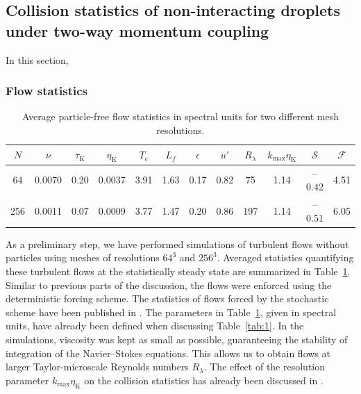 \documentclass[../thesis.tex]{subfiles}
\begin{document}
\subsection{Collision statistics of non-interacting droplets under two-way momentum coupling\label{sec:2way}}
In this section, 

\subsubsection{Flow statistics}

\begin{table}[!b]%
\center
  \begin{tabular}{cccccccccccc}
  \hline
  $N$ & $\nu$ & $\tau_\text{K}$ & $\eta_\text{K}$ & $T_e$ & $L_f$ & $\epsilon$ & $u'$ & $R_{\lambda}$ & $k_\text{max}\eta_\text{K}$ & $\mathcal{S}$ & $\mathcal{F}$ \\\hline
  64 &  0.0070 & 0.20 & 0.0037 & 3.91 & 1.63 & 0.17 & 0.82 & 75  & 1.14 & --0.42 & 4.51 \\
  256 & 0.0011 & 0.07 & 0.0009 & 3.77 & 1.47 & 0.20 & 0.86 & 197 & 1.14 & --0.51 & 6.05 \\
  \hline
  \end{tabular}
\caption{Average particle-free flow statistics in spectral units for two different mesh resolutions.}
\label{Table2}
\end{table}%

As a preliminary step, we have performed simulations of turbulent flows without particles using meshes of resolutions $64^3$ and $256^3$. Averaged statistics quantifying these turbulent flows at the statistically steady state are summarized in Table~\ref{Table2}. Similar to previous parts of the discussion, the flows were enforced using the deterministic forcing scheme. The statistics of flows forced by the stochastic scheme have been published in \cite{RPAGW13}. The parameters in Table~\ref{Table2}, given in spectral units, have already been defined when discussing Table~\ref{tab:1}. In the simulations, viscosity was kept as small as possible, guaranteeing the stability of integration of the Navier--Stokes equations. This allows us to obtain flows at larger Taylor-microscale Reynolds numbers $R_{\lambda}$. The effect of the resolution parameter $k_\text{max}\eta_\text{K}$ on the collision statistics has already been discussed in \cite{RPW20}.
\end{document}
